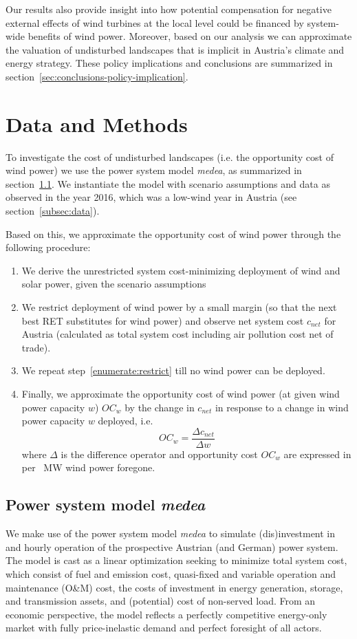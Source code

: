 \documentclass[review, 3p, times, 12pt]{elsarticle} %
\begin{document}
Our results also provide insight into how potential compensation for negative external effects of wind turbines at the local level could be financed by system-wide benefits of wind power.
Moreover, based on our analysis we can approximate the valuation of undisturbed landscapes that is implicit in Austria's climate and energy strategy.
These policy implications and conclusions are summarized in section~\ref{sec:conclusions-policy-implication}.


\section{Data and Methods} \label{sec:data-and-methods}
To investigate the cost of undisturbed landscapes (i.e. the opportunity cost of wind power) we use the power system model \emph{medea}, as summarized in section~\ref{subsec:medea}.
We instantiate the model with scenario assumptions and data as observed in the year 2016, which was a low-wind year in Austria (see section~\ref{subsec:data}).

Based on this, we approximate the opportunity cost of wind power through the following procedure:
\begin{enumerate}
\item We derive the unrestricted system cost-minimizing deployment of wind and solar power, given the scenario
assumptions
\item We restrict deployment of wind power by a small margin (so that the next best RET substitutes for wind
power) and observe net system cost $c_{net}$ for Austria (calculated as total system cost including air
pollution cost net of trade).\label{enumerate:restrict}
\item We repeat step~\ref{enumerate:restrict} till no wind power can be deployed.
\item Finally, we approximate the opportunity cost of wind power (at given wind power capacity $w$) $OC_w$ by
the change in $c_{net}$ in response to a change in wind power capacity $w$ deployed, i.e.
\[OC_w = \frac{\Delta c_{net}}{\Delta w}\]
where $\Delta$ is the difference operator and opportunity cost $OC_w$ are expressed in \EUR per
\SI{}{\mega\watt} wind power foregone.
\end{enumerate}

\subsection{Power system model \emph{medea}}\label{subsec:medea}
We make use of the power system model \emph{medea} to simulate (dis)investment in and hourly operation of the
prospective Austrian (and German) power system.
The model is cast as a linear optimization seeking to minimize total system cost, which consist of fuel and emission
cost, quasi-fixed and variable operation and maintenance (O\&M) cost, the costs of investment in energy generation,
storage, and transmission assets, and (potential) cost of non-served load.
From an economic perspective, the model reflects a perfectly competitive energy-only market with fully
price-inelastic demand and perfect foresight of all actors.
\end{document}
